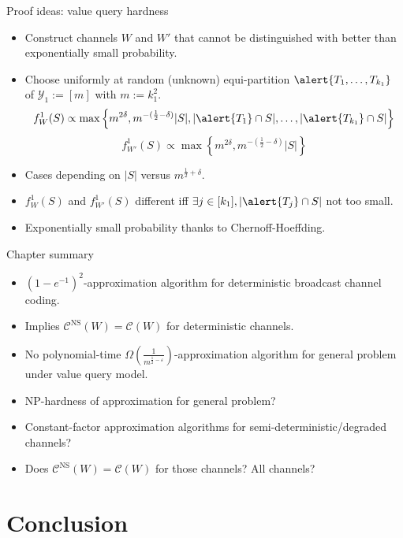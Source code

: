 \documentclass{beamer}
\theoremstyle{definition}
\theoremstyle{remark}
\begin{document}
\begin{frame}{Proof ideas: value query hardness}
  \begin{itemize}
  \item Construct channels $W$ and $W'$ that cannot be distinguished with better than exponentially small probability.
    \pause
    \bigskip
  \item Choose uniformly at random (unknown) equi-partition $\alert{T_1,\ldots,T_{k_1}}$ of $\mathcal{Y}_1 := [m]$ with $m:=k_1^2$.
    \pause
    \[ f_W^1(S) \propto \max\left\{ m^{2\delta}, m^{-(\frac{1}{2}-\delta)}|S|, |\alert{T_1} \cap S|,\ldots,|\alert{T_{k_1}} \cap S|\right\} \]
    \[ f_{W'}^1(S) \propto \max\left\{ m^{2\delta}, m^{-(\frac{1}{2}-\delta)}|S|\right\} \]
    \pause
  \item Cases depending on $|S|$ versus $ m^{\frac{1}{2}+\delta}$.
  \item $f_W^1(S)$ and $f_{W'}^1(S)$ different iff $\exists j \in [k_1], |\alert{T_j} \cap S|$ not too small.
  \item Exponentially small probability thanks to Chernoff-Hoeffding.
  \end{itemize}
\end{frame}

\begin{frame}{Chapter summary}
  \begin{itemize}
  \item $(1-e^{-1})^2$-approximation algorithm for deterministic broadcast channel coding.
  \item Implies $\mathcal{C}^{\mathrm{NS}}(W)=\mathcal{C}(W)$ for deterministic channels.
    \pause
  \item No polynomial-time $\Omega\left(\frac{1}{m^{\frac{1}{2}-\varepsilon}}\right)$-approximation algorithm for general problem under value query model.
    \pause
    \bigskip
  \item \textrm{NP}-hardness of approximation for general problem?
  \item Constant-factor approximation algorithms for semi-deterministic/degraded channels?
  \item Does $\mathcal{C}^{\mathrm{NS}}(W)=\mathcal{C}(W)$ for those channels? All channels?
  \end{itemize}
\end{frame}

\section{Conclusion}
\end{document}
